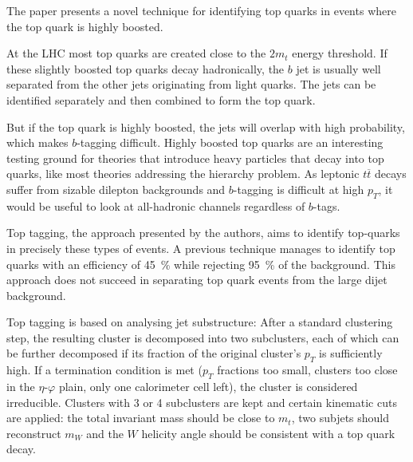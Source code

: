 

\noindent
The paper\cite{kaplan} presents a novel technique for identifying top quarks in events where the top quark is highly boosted.

At the LHC most top quarks are created close to the $2m_t$ energy threshold.
If these slightly boosted top quarks decay hadronically, the $b$ jet is usually well separated from the other jets originating from light quarks.
The jets can be identified separately and then combined to form the top quark.

But if the top quark is highly boosted, the jets will overlap with high probability, which makes $b$-tagging difficult.
Highly boosted top quarks are an interesting testing ground for theories that introduce heavy particles that decay into top quarks, like most theories addressing the hierarchy problem.
As leptonic $t\overline{t}$ decays suffer from sizable dilepton backgrounds and $b$-tagging is difficult at high $p_T$, it would be useful to look at all-hadronic channels regardless of $b$-tags.

Top tagging, the approach presented by the authors, aims to identify top-quarks in precisely these types of events.
A previous technique\cite{brooijmans} manages to identify top quarks with an efficiency of \SI{45}{\percent} while rejecting \SI{95}{\percent} of the background.
This approach does not succeed in separating top quark events from the large dijet background.

Top tagging is based on analysing jet substructure:
After a standard clustering step, the resulting cluster is decomposed into two subclusters, each of which can be further decomposed if its fraction of the original cluster's $p_T$ is sufficiently high.
If a termination condition is met ($p_T$ fractions too small, clusters too close in the $η$-$φ$ plain, only one calorimeter cell left), the cluster is considered irreducible.
Clusters with 3 or 4 subclusters are kept and certain kinematic cuts are applied: the total invariant mass should be close to $m_t$, two subjets should reconstruct $m_W$ and the $W$ helicity angle should be consistent with a top quark decay.


